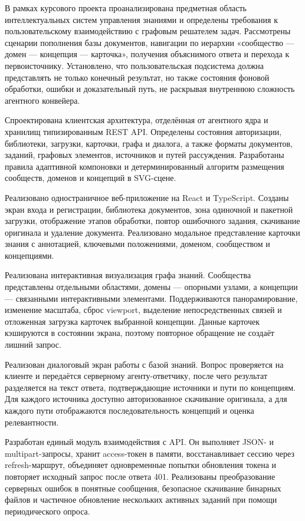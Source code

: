 
В рамках курсового проекта проанализирована предметная область интеллектуальных систем управления знаниями и определены требования к пользовательскому взаимодействию с графовым решателем задач. Рассмотрены сценарии пополнения базы документов, навигации по иерархии «сообщество --- домен --- концепция --- карточка», получения объяснимого ответа и перехода к первоисточнику. Установлено, что пользовательская подсистема должна представлять не только конечный результат, но также состояния фоновой обработки, ошибки и доказательный путь, не раскрывая внутреннюю сложность агентного конвейера.

Спроектирована клиентская архитектура, отделённая от агентного ядра и хранилищ типизированным REST API. Определены состояния авторизации, библиотеки, загрузки, карточки, графа и диалога, а также форматы документов, заданий, графовых элементов, источников и путей рассуждения. Разработаны правила адаптивной компоновки и детерминированный алгоритм размещения сообществ, доменов и концепций в SVG-сцене.

Реализовано одностраничное веб-приложение на React и TypeScript. Созданы экран входа и регистрации, библиотека документов, зона одиночной и пакетной загрузки, отображение этапов обработки, повтор ошибочного задания, скачивание оригинала и удаление документа. Реализовано модальное представление карточки знания с аннотацией, ключевыми положениями, доменом, сообществом и концепциями.

Реализована интерактивная визуализация графа знаний. Сообщества представлены отдельными областями, домены --- опорными узлами, а концепции --- связанными интерактивными элементами. Поддерживаются панорамирование, изменение масштаба, сброс viewport, выделение непосредственных связей и отложенная загрузка карточек выбранной концепции. Данные карточек кэшируются в состоянии экрана, поэтому повторное обращение не создаёт лишний запрос.

Реализован диалоговый экран работы с базой знаний. Вопрос проверяется на клиенте и передаётся серверному агенту-ответчику, после чего результат разделяется на текст ответа, подтверждающие источники и пути по концепциям. Для каждого источника доступно авторизованное скачивание оригинала, а для каждого пути отображаются последовательность концепций и оценка релевантности.

Разработан единый модуль взаимодействия с API. Он выполняет JSON- и multipart-запросы, хранит access-токен в памяти, восстанавливает сессию через refresh-маршрут, объединяет одновременные попытки обновления токена и повторяет исходный запрос после ответа 401. Реализованы преобразование серверных ошибок в понятные сообщения, безопасное скачивание бинарных файлов и частичное обновление нескольких активных заданий при помощи периодического опроса.

